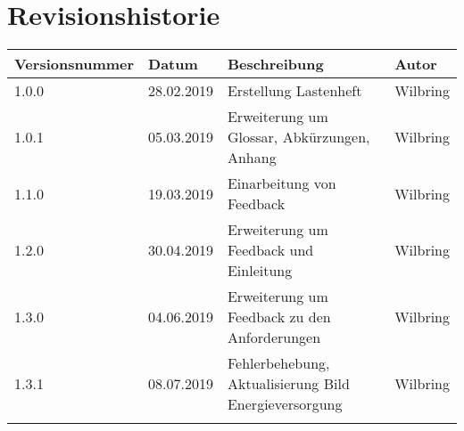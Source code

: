 \section*{Revisionshistorie}

\begin{tabular}{|p{3cm}|p{2cm}|p{5.5cm}|p{2cm}|}
\hline
Versionsnummer  & Datum         & Beschreibung          & Autor     \\
\hline
 1.0.0          & 28.02.2019    & Erstellung Lastenheft & Wilbring  \\\hline
 1.0.1          & 05.03.2019    & Erweiterung um Glossar, Abkürzungen, Anhang  & Wilbring      \\\hline
 1.1.0          & 19.03.2019    & Einarbeitung von Feedback & Wilbring \\\hline
 1.2.0          & 30.04.2019    & Erweiterung um Feedback und Einleitung & Wilbring \\\hline
 1.3.0          & 04.06.2019    & Erweiterung um Feedback zu den Anforderungen & Wilbring \\\hline
 1.3.1          & 08.07.2019    & Fehlerbehebung, Aktualisierung Bild Energieversorgung & Wilbring \\\hline
                &               &                       &           \\\hline
\end{tabular}

